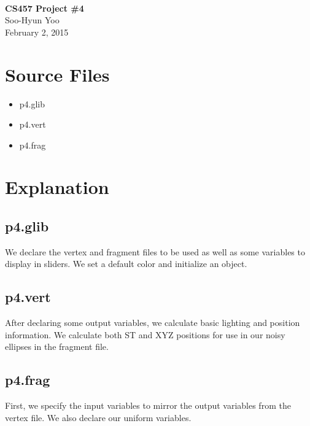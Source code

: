 \documentclass[12pt,letterpaper]{article}
\begin{document}
\fancyfoot{}
\begin{center}
    \hfill \\
    \vspace{4in}
    {\bf\Huge CS457 Project \#4 \\}
    \vspace{2in}
    {\Large Soo-Hyun Yoo \\ February 2, 2015}
\end{center}

\newpage
{}

\section*{Source Files}

\begin{itemize}
    \item p4.glib
    \item p4.vert
    \item p4.frag
\end{itemize}


\section*{Explanation}

\subsection*{p4.glib}

We declare the vertex and fragment files to be used as well as some variables
to display in sliders. We set a default color and initialize an object.

\subsection*{p4.vert}

After declaring some output variables, we calculate basic lighting and position
information. We calculate both ST and XYZ positions for use in our noisy
ellipses in the fragment file.

\subsection*{p4.frag}

First, we specify the input variables to mirror the output variables from the
vertex file. We also declare our uniform variables.
\end{document}
